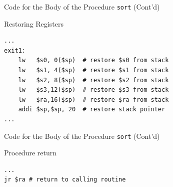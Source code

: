 \begin{frame}[fragile]{Code for the Body of the Procedure \texttt{sort} (Cont'd)}
\begin{flushleft}
Restoring Registers
\begin{lstlisting}[keywordstyle=\color{purple}\textbf, keywords={lw, addi}, numbers=none]
...
exit1: 
    lw   $s0, 0($sp)  # restore $s0 from stack
    lw   $s1, 4($sp)  # restore $s1 from stack
    lw   $s2, 8($sp)  # restore $s2 from stack
    lw   $s3,12($sp)  # restore $s3 from stack
    lw   $ra,16($sp)  # restore $ra from stack
    addi $sp,$sp, 20  # restore stack pointer
...
\end{lstlisting}
\end{flushleft}
\end{frame}

\begin{frame}[fragile]{Code for the Body of the Procedure \texttt{sort} (Cont'd)}
\begin{flushleft}
Procedure return
\begin{lstlisting}[keywordstyle=\color{purple}\textbf, keywords={jr}, numbers=none]
...
jr $ra # return to calling routine
\end{lstlisting}
\end{flushleft}
\end{frame}
